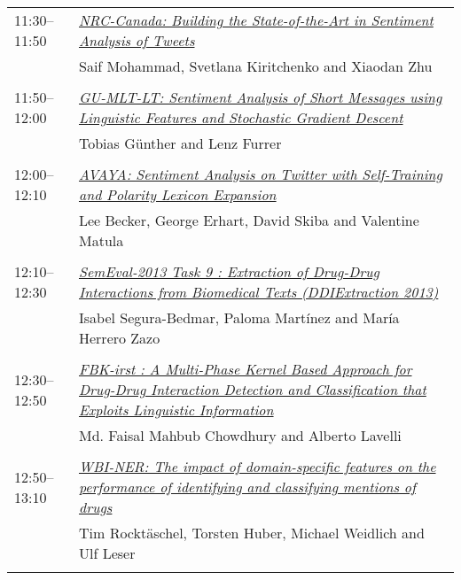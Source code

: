 \begin{tabular}{p{20mm}p{138mm}}
11:30--11:50 & \hyperlink{page.321}{\em NRC-Canada: Building the State-of-the-Art in Sentiment Analysis of Tweets}\\
         & Saif Mohammad, Svetlana Kiritchenko and Xiaodan Zhu \\
\\

11:50--12:00 & \hyperlink{page.328}{\em GU-MLT-LT: Sentiment Analysis of Short Messages using Linguistic Features and Stochastic Gradient Descent}\\
         & Tobias G\"{u}nther and Lenz Furrer \\
\\

12:00--12:10 & \hyperlink{page.333}{\em AVAYA: Sentiment Analysis on Twitter with Self-Training and Polarity Lexicon Expansion}\\
         & Lee Becker, George Erhart, David Skiba and Valentine Matula \\
\\

12:10--12:30 & \hyperlink{page.341}{\em SemEval-2013 Task 9 : Extraction of Drug-Drug Interactions from Biomedical Texts (DDIExtraction 2013)}\\
         & Isabel Segura-Bedmar, Paloma Mart\'{i}nez and Mar\'{i}a Herrero Zazo \\
\\

12:30--12:50 & \hyperlink{page.351}{\em FBK-irst : A Multi-Phase Kernel Based Approach for Drug-Drug Interaction Detection and Classification that Exploits Linguistic Information}\\
         & Md. Faisal Mahbub Chowdhury and Alberto Lavelli \\
\\

12:50--13:10 & \hyperlink{page.356}{\em WBI-NER: The impact of domain-specific features on the performance of identifying and classifying mentions of drugs}\\
         & Tim Rockt\"{a}schel, Torsten Huber, Michael Weidlich and Ulf Leser \\
\\

\end{tabular}
\newpage
